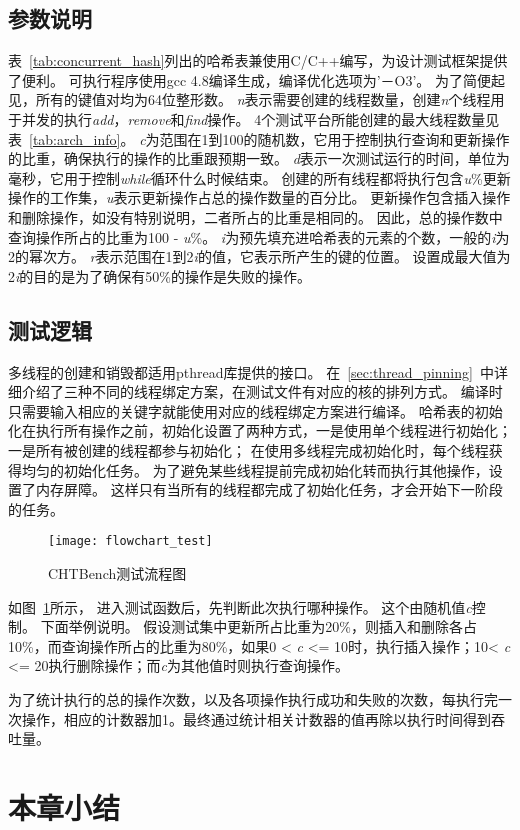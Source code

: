 \subsection{参数说明}
表~\ref{tab:concurrent_hash}列出的哈希表兼使用C/C++编写，为设计测试框架提供了便利。
可执行程序使用gcc 4.8编译生成，编译优化选项为'－O3'。
为了简便起见，所有的键值对均为64位整形数。
\textit{n}表示需要创建的线程数量，创建\textit{n}个线程用于并发的执行\textit{add}，\textit{remove}和\textit{find}操作。
4个测试平台所能创建的最大线程数量见表~\ref{tab:arch_info}。
\textit{c}为范围在1到100的随机数，它用于控制执行查询和更新操作的比重，确保执行的操作的比重跟预期一致。
\textit{d}表示一次测试运行的时间，单位为毫秒，它用于控制\textit{while}循环什么时候结束。
创建的所有线程都将执行包含\textit{u}\%更新操作的工作集，\textit{u}表示更新操作占总的操作数量的百分比。
更新操作包含插入操作和删除操作，如没有特别说明，二者所占的比重是相同的。
因此，总的操作数中查询操作所占的比重为100 - \textit{u}\%。
\textit{i}为预先填充进哈希表的元素的个数，一般的\textit{i}为2的幂次方。
\textit{r}表示范围在1到2\textit{i}的值，它表示所产生的键的位置。
设置成最大值为2\textit{i}的目的是为了确保有50\%的操作是失败的操作。

\subsection{测试逻辑}
\label{sec:para_config}
多线程的创建和销毁都适用pthread库提供的接口。
在~\ref{sec:thread_pinning}~中详细介绍了三种不同的线程绑定方案，在测试文件有对应的核的排列方式。
编译时只需要输入相应的关键字就能使用对应的线程绑定方案进行编译。
哈希表的初始化在执行所有操作之前，初始化设置了两种方式，一是使用单个线程进行初始化；一是所有被创建的线程都参与初始化；
在使用多线程完成初始化时，每个线程获得均匀的初始化任务。
为了避免某些线程提前完成初始化转而执行其他操作，设置了内存屏障。
这样只有当所有的线程都完成了初始化任务，才会开始下一阶段的任务。

\begin{figure}[htbp]
\centering
\texttt{[image: flowchart\_test]}
\caption{CHTBench测试流程图}\label{fig:flowchart}
\end{figure}

如图~\ref{fig:flowchart}所示，
进入测试函数后，先判断此次执行哪种操作。
这个由随机值\textit{c}控制。
下面举例说明。
假设测试集中更新所占比重为20\%，则插入和删除各占10\%，而查询操作所占的比重为80\%，如果0 < \textit{c} <= 10时，执行插入操作；10< \textit{c} <= 20执行删除操作；而\textit{c}为其他值时则执行查询操作。

为了统计执行的总的操作次数，以及各项操作执行成功和失败的次数，每执行完一次操作，相应的计数器加1。最终通过统计相关计数器的值再除以执行时间得到吞吐量。

\section{本章小结}
